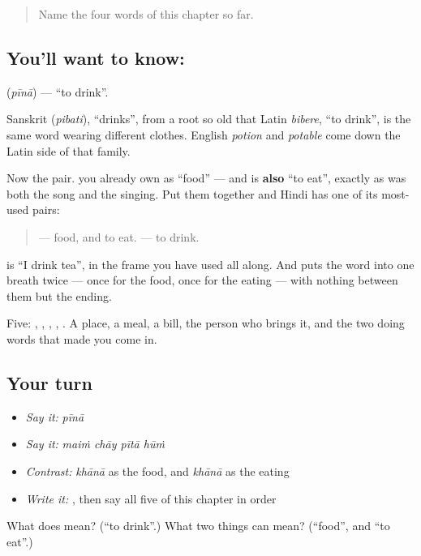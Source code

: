 \label{lesson:HI-C73-drink}



\begin{quote}
Name the four words of this chapter so far.
\end{quote}

\subsection*{You'll want to know: }
\textbf{} (\emph{pīnā}) — \textquotedblleft{}to drink\textquotedblright{}.

Sanskrit  (\emph{pibati}), \textquotedblleft{}drinks\textquotedblright{}, from a root so old that Latin \emph{bibere}, \textquotedblleft{}to drink\textquotedblright{}, is the same word wearing different clothes. English \emph{potion} and \emph{potable} come down the Latin side of that family.

Now the pair. \textbf{} you already own as \textquotedblleft{}food\textquotedblright{} — and  is \textbf{also} \textquotedblleft{}to eat\textquotedblright{}, exactly as  was both the song and the singing. Put them together and Hindi has one of its most-used pairs:

\begin{quote}
\textbf{} — food, and to eat. \textbf{} — to drink.
\end{quote}

\textbf{   } is \textquotedblleft{}I drink tea\textquotedblright{}, in the frame you have used all along. And \textbf{   } puts the word into one breath twice — once for the food, once for the eating — with nothing between them but the ending.

\begin{grammarlens}[title={What you've built}]
Five: , , , , . A place, a meal, a bill, the person who brings it, and the two doing words that made you come in.
\end{grammarlens}

\subsection*{Your turn}
\begin{itemize}
\raggedright
  \item \emph{Say it:} \emph{pīnā}
  \item \emph{Say it:} \emph{maiṁ chāy pītā hūṁ}
  \item \emph{Contrast:} \emph{khānā} as the food, and \emph{khānā} as the eating
  \item \emph{Write it:} , then say all five of this chapter in order
\end{itemize}

\begin{tcolorbox}[breakable,colback=teal!4,colframe=teal!35!black,title={Before you move on}]
What does  mean? (\textquotedblleft{}to drink\textquotedblright{}.) What two things can  mean? (\textquotedblleft{}food\textquotedblright{}, and \textquotedblleft{}to eat\textquotedblright{}.)
\end{tcolorbox}
